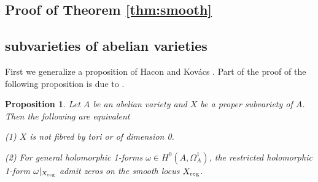 \documentclass[a4paper,12pt,reqno]{amsart}
\theoremstyle{plain}
\newtheorem{proposition}[theorem]{Proposition}
\theoremstyle{remark}
\begin{document}
\subsection{Proof of Theorem \ref{thm:smooth}}















\subsection{subvarieties of abelian varieties}

First we generalize a proposition of Hacon and Kov\'acs \cite[Proposition 3.1]{HK05}. Part of the proof of the following proposition is due to \cite{HK05}.

\begin{proposition}\label{van-nonsimple}
Let $A$ be an abelian variety and $X$ be a proper subvariety of $A$. Then the following are equivalent

(1) $X$ is not fibred by tori or of dimension 0. 

(2) For general holomorphic 1-forms $\omega\in H^0(A, \Omega_A^1)$, the restricted holomorphic 1-form $\omega|_{X_{\textnormal{reg}}}$ admit zeros on the smooth locus $X_{\textnormal{reg}}$.
\end{proposition}
\end{document}
